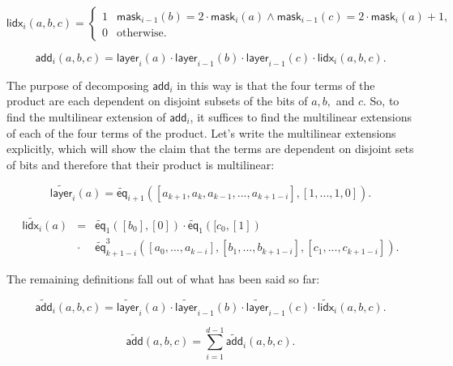 \documentclass[11pt]{article}
\begin{document}
\begin{equation}
	\mathsf{lidx}_i(a, b, c) =
	\begin{cases}
		1 & \mathsf{mask}_{i-1}(b) = 2 \cdot \mathsf{mask}_i(a) \wedge \mathsf{mask}_{i-1}(c) = 2 \cdot \mathsf{mask}_i(a) + 1, \\
		0 & \text{otherwise}.
	\end{cases}
\end{equation}

\begin{equation}
	\mathsf{add}_i(a, b, c) =
	\mathsf{layer}_i(a) \cdot \mathsf{layer}_{i-1}(b) \cdot \mathsf{layer}_{i-1}(c) \cdot \mathsf{lidx}_i(a, b, c).
\end{equation}

The purpose of decomposing $\mathsf{add}_i$ in this way is that the four terms of the product are each
dependent on disjoint subsets of the bits of $a, b,$ and $c$. So, to find the multilinear extension of
$\mathsf{add}_i$, it suffices to find the multilinear extensions of each of the four terms of the product.
Let's write the multilinear extensions explicitly, which will show the claim that the terms are dependent
on disjoint sets of bits and therefore that their product is multilinear:

\begin{equation}
	\widetilde{\mathsf{layer}}_i(a) = \widetilde{\mathsf{eq}}_{i+1}([a_{k+1}, a_k, a_{k-1}, ..., a_{k+1-i}], [1, ..., 1, 0]).
\end{equation}

\begin{equation}
	\begin{array}{rcl}
		\widetilde{\mathsf{lidx}_i}(a) &=& \widetilde{\mathsf{eq}}_1([b_0], [0]) \cdot \widetilde{\mathsf{eq}}_1([c_0, [1]) \\
		&\cdot& \widetilde{\mathsf{eq}}^3_{k+1-i}([a_0, ..., a_{k-i}], [b_1, ..., b_{k+1-i}], [c_1, ..., c_{k+1-i}]).
	\end{array}
\end{equation}

The remaining definitions fall out of what has been said so far:

\begin{equation}
	\widetilde{\mathsf{add}}_i(a, b, c) = \widetilde{\mathsf{layer}}_i(a) \cdot \widetilde{\mathsf{layer}}_{i-1}(b) \cdot \widetilde{\mathsf{layer}}_{i-1}(c) \cdot \widetilde{\mathsf{lidx}}_i(a, b, c).
\end{equation}

\begin{equation}
	\widetilde{\mathsf{add}}(a, b, c) = \sum_{i=1}^{d-1} \widetilde{\mathsf{add}}_i(a, b, c).
\end{equation}
\end{document}
